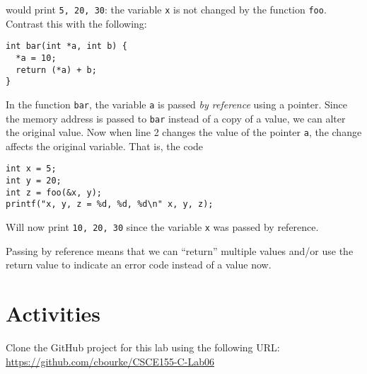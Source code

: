 \documentclass[12pt]{scrartcl}
\begin{document}
would print \texttt{5, 20, 30}: the variable \texttt{x} is not
changed by the function \texttt{foo}.  Contrast this with the following:

\begin{verbatim}
int bar(int *a, int b) {
  *a = 10;
  return (*a) + b;
}
\end{verbatim}

In the function \texttt{bar}, the variable \texttt{a} is passed
\emph{by reference} using a pointer.  Since the memory address is passed
to \texttt{bar} instead of a copy of a value, we can alter the original
value.  Now when line 2 changes the value of the pointer \texttt{a}, 
the change affects the original variable.  That is, the code 

\begin{verbatim}
int x = 5;
int y = 20;
int z = foo(&x, y);
printf("x, y, z = %d, %d, %d\n" x, y, z);
\end{verbatim}

Will now print \texttt{10, 20, 30} since the variable \texttt{x}
was passed by reference.

Passing by reference means that we can ``return'' multiple values and/or use
the return value to indicate an error code instead of a value now.

\section{Activities}

Clone the GitHub project for this lab using the following URL:
\url{https://github.com/cbourke/CSCE155-C-Lab06}
\end{document}
